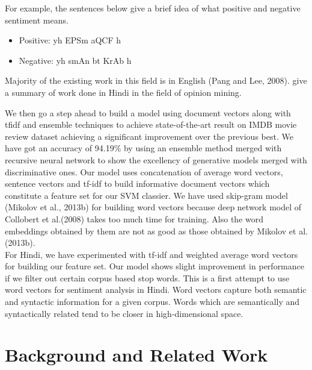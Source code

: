 \documentclass[11pt,a4paper]{article}
\begin{document}
For example, the sentences below give a brief idea of what positive and negative sentiment means.
\begin{itemize}
\item Positive: {\dn yh EPSm aQCF h\4}
\item Negative: {\dn yh smAn bt KrAb h\4}
\end{itemize}
Majority of the existing work in this field is in English (Pang and Lee, 2008). \cite{Sharma:14} give a summary of work done in Hindi in the field of opinion mining.

We then go a step ahead to build a model using document vectors along with tfidf and ensemble techniques to achieve state-of-the-art result on IMDB movie review dataset achieving a significant improvement over the previous best. We have got an accuracy of 94.19\% by using an ensemble method merged with recursive neural network to show the excellency of generative models merged with discriminative ones.
Our model uses concatenation of average word vectors, sentence vectors and tf-idf to build informative document vectors which constitute a feature set for our SVM classier. We have used skip-gram model (Mikolov et al., 2013b) for building word vectors because deep network model of Collobert et al.(2008) takes too much time for training. Also the word embeddings obtained by them are not as good as those obtained by Mikolov et al.(2013b). \\
For Hindi, we have experimented with tf-idf and weighted average word vectors for building our feature set. Our model shows slight improvement in performance if we filter out certain corpus based stop words. This is a first attempt to use word vectors for sentiment analysis in Hindi. Word vectors capture both semantic and syntactic information for a given corpus. Words which are semantically and syntactically related tend to be closer in high-dimensional space.\\

\section{Background and Related Work}
\end{document}
